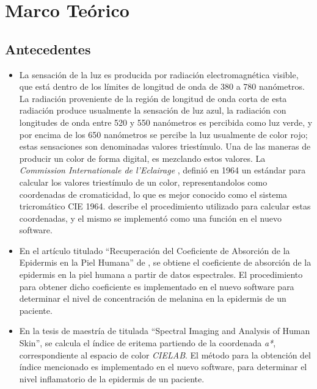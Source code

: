 \chapter{\label{cap:2}Marco Te\'{o}rico}

	\section{Antecedentes}	
		\begin{itemize}
		
			\item
				La sensaci\'{o}n de la luz es producida por radiaci\'{o}n electromagn\'{e}tica visible, que est\'{a} dentro de los l\'{i}mites de longitud de onda de 380 a 780 nan\'{o}metros. La radiaci\'{o}n proveniente de la regi\'{o}n de longitud de onda corta de esta radiaci\'{o}n produce usualmente la sensaci\'{o}n de luz azul, la radiaci\'{o}n con longitudes de onda entre 520 y 550 nan\'{o}metros es percibida como luz verde, y por encima de los 650 nan\'{o}metros se percibe la luz usualmente de color rojo; estas sensaciones son denominadas valores triest\'{i}mulo. Una de las maneras de producir un color de forma digital, es mezclando estos valores. La \textit{\mbox{Commission} Internationale de l'Eclairage} \cite{CIE}, defini\'{o} en 1964 un est\'{a}ndar para calcular los valores triest\'{i}mulo de un color, representandolos como coordenadas de cromaticidad, lo que es mejor conocido como el sistema tricrom\'{a}tico CIE 1964. \cite{Schanda} describe el procedimiento utilizado para calcular estas coordenadas, y el mismo se implement\'{o} como una funci\'{o}n en el nuevo software.
			
			\item En el art\'{i}culo titulado ``Recuperaci\'{o}n del Coeficiente de Absorci\'{o}n de la Epidermis en la Piel Humana'' de \cite{Narea}, se obtiene el coeficiente de absorci\'{o}n de la epidermis en la piel humana a partir de datos espectrales. El procedimiento para obtener dicho coeficiente es implementado en el nuevo software para determinar el nivel de concentraci\'{o}n de melanina en la epidermis de un paciente.
			
			\item En la tesis de maestr\'{i}a de \cite{Bersha} titulada ``Spectral Imaging and Analysis of Human Skin'', se calcula el \'{i}ndice de eritema partiendo de la coordenada \textit{a*}, correspondiente al espacio de color \textit{CIELAB}. El m\'{e}todo para la obtenci\'{o}n del \'{i}ndice mencionado es implementado en el nuevo software, para determinar el nivel inflamatorio de la epidermis de un paciente.
		\end{itemize}

